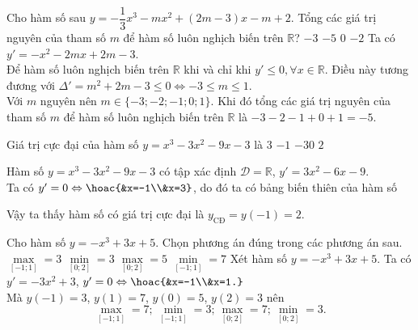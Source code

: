 \begin{ex}%
Cho hàm số sau $y=-\dfrac{1}{3} x^3-m x^2+(2 m-3) x-m+2$. Tổng các giá trị nguyên của tham số $m$ để	hàm số luôn nghịch biến trên $\mathbb{R}$?
	\choice
	{$-3$}
	{\True $-5$}
	{$0$}
	{$-2$}
	\loigiai
	{Ta có $y'=-x^2-2mx+2m-3$.\\
	Để hàm số luôn nghịch biến trên $\mathbb{R}$ khi và chỉ khi $y'\le 0, \forall x\in \mathbb{R}$. Điều này tương đương với $\Delta'=m^2+2m-3\le 0\Leftrightarrow -3\le m\le 1$.\\
Với $m$ nguyên nên $m\in \{-3;-2;-1;0;1\}$. Khi đó tổng các giá trị nguyên của tham số $m$ để	hàm số luôn nghịch biến trên $\mathbb{R}$ là $-3-2-1+0+1=-5$.}
\end{ex}

\begin{ex}%
    Giá trị cực đại của hàm số $y=x^3-3x^2-9x-3$ là
    \choice
    {$3$}
    {$-1$}
    {$-30$}
    {\True $2$}
    \loigiai
    {Hàm số $y=x^3-3x^2-9x-3$ có tập xác định $\mathscr{D}=\mathbb{R}$, $y'=3x^2-6x-9$.\\
        Ta có $y'=0\Leftrightarrow \hoac{&x=-1\\&x=3}$, do đó ta có bảng biến thiên của hàm số
        \begin{center}
        \end{center}
        Vậy ta thấy hàm số có giá trị cực đại là $y_{\text{CĐ}}=y(-1)=2$.}
\end{ex}

\begin{ex}%
    Cho hàm số $y=-x^3+3x+5$. Chọn phương án đúng trong các phương án sau.
    \choice
    {$\max\limits_{[-1;1]}=3$}
    {\True $\min\limits_{[0;2]}=3$}
    {$\max\limits_{[0;2]}=5$}
    {$\min\limits_{[-1;1]}=7$}
    \loigiai
    {Xét hàm số $y=-x^3+3x+5$.
    Ta có $y'=-3x^2+3$, $y'=0\Leftrightarrow \hoac{&x=-1\\&x=1.}$\\
    Mà $y(-1)=3$, $y(1)=7$, $y(0)=5$, $y(2)=3$ nên
    \[\max\limits_{[-1;1]}=7;\, \min\limits_{[-1;1]}=3;\, \max\limits_{[0;2]}=7;\, \min\limits_{[0;2]}=3.\]}
\end{ex}

